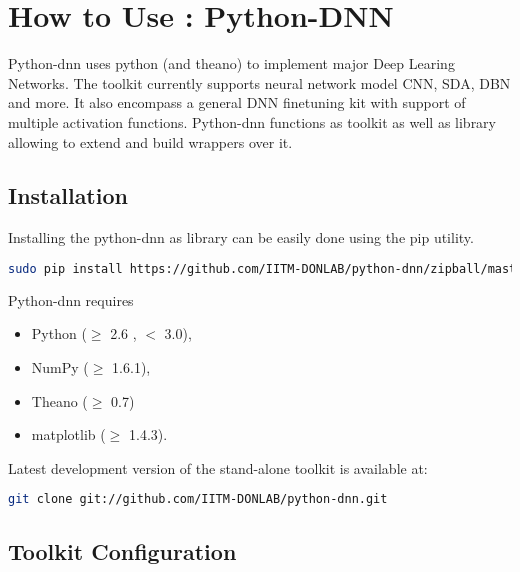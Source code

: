 \appendix
\label{app:pydnn}
\chapter{How to Use : Python-DNN}
Python-dnn uses python (and theano) to implement major Deep Learing Networks. The toolkit currently supports neural network model CNN, SDA, DBN and more. It also encompass a  general DNN finetuning kit with support of multiple activation functions. Python-dnn functions as toolkit as well as library allowing to extend and build wrappers over it.
\section{Installation}
Installing  the python-dnn as library can be easily done using the pip utility.
\begin{lstlisting}[language=bash,basicstyle=\small] 
sudo pip install https://github.com/IITM-DONLAB/python-dnn/zipball/master
\end{lstlisting}
Python-dnn requires 
\begin{itemize}
	\item Python ($\geq$ 2.6 , $<$ 3.0),
	\item NumPy ($\geq$ 1.6.1),
	\item Theano ($\geq$ 0.7)
	\item matplotlib ($\geq$ 1.4.3).
\end{itemize}
\noindent Latest development version of the stand-alone toolkit is available at:
\begin{lstlisting}[language=bash,basicstyle=\small] 
git clone git://github.com/IITM-DONLAB/python-dnn.git
\end{lstlisting}

\section{Toolkit Configuration} 
